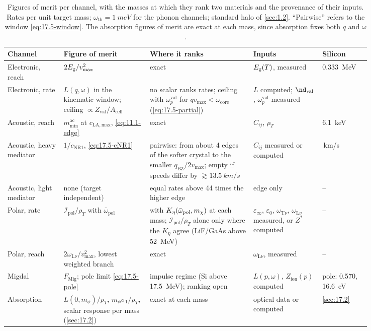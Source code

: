 \begin{table}[tbp]
\centering
\caption{Figures of merit per channel, with the masses at which they rank two materials and the provenance of their inputs. Rates per unit target mass; $\omega_{\mathrm{th}} = \SI{1}{meV}$ for the phonon channels; standard halo of \cref{sec:1.2}. ``Pairwise'' refers to the window \cref{eq:17.5-window}. The absorption figures of merit are exact at each mass, since absorption fixes both $q$ and $\omega$.}
\label{tab:17-fom}
\footnotesize
\begin{tabular}{>{\raggedright\arraybackslash}p{0.13\linewidth}>{\raggedright\arraybackslash}p{0.20\linewidth}>{\raggedright\arraybackslash}p{0.24\linewidth}>{\raggedright\arraybackslash}p{0.16\linewidth}>{\raggedright\arraybackslash}p{0.11\linewidth}}
\toprule
Channel & Figure of merit & Where it ranks & Inputs & Silicon \\
\midrule
Electronic, reach & $2E_{\mathrm{g}}/v_{\mathrm{max}}^2$ & exact & $E_{\mathrm{g}}(T)$, measured & \SI{0.333}{MeV} \\
Electronic, rate & $L(q,\omega)$ in the kinematic window; ceiling $\propto Z_{\mathrm{val}}/A_{\mathrm{cell}}$ & no scalar ranks rates; ceiling with $\omega_p^{\mathrm{val}}$ for $qv_{\mathrm{max}} < \omega_{\mathrm{core}}$ (\cref{eq:17.5-partial}) & $L$ computed; $\nd_{\mathrm{val}}$, $\omega_p^{\mathrm{val}}$ measured & 0.142 \\
Acoustic, reach & $m_{\mathrm{min}}^{\mathrm{ac}}$ at $c_{\mathrm{LA,max}}$, \cref{eq:11.1-edge} & exact & $C_{ij}$, $\rho_T$ & \SI{6.1}{keV} \\
Acoustic, heavy mediator & $1/c_{\mathrm{NR1}}$, \cref{eq:17.5-cNR1} & pairwise: from about 4 edges of the softer crystal to the smaller $q_{\mathrm{BZ}}/2v_{\mathrm{max}}$; empty if speeds differ by $\gtrsim\SI{13.5}{km/s}$ & $C_{ij}$ measured or computed & 8.956\,km/s \\
Acoustic, light mediator & none (target independent) & equal rates above 44 times the higher edge & edge only & -- \\
Polar, rate & $\mathcal{I}_{\mathrm{pol}}/\rho_T$ with $\bar\omega_{\mathrm{pol}}$ & with $K_\eta(\bar\omega_{\mathrm{pol}},m_{\chi})$ at each mass; $\mathcal{I}_{\mathrm{pol}}/\rho_T$ alone only where the $K_\eta$ agree (LiF/GaAs above \SI{52}{MeV}) & $\varepsilon_\infty$, $\varepsilon_0$, $\omega_{\mathrm{T}\nu}$, $\omega_{\mathrm{L}\nu}$ measured, or $Z^*$ computed & -- \\
Polar, reach & $2\omega_{\mathrm{L}\nu}/v_{\mathrm{max}}^2$, lowest weighted branch & exact & $\omega_{\mathrm{L}\nu}$, measured & -- \\
Migdal & $F_{\mathrm{Mig}}$; pole limit \cref{eq:17.5-pole} & impulse regime (Si above \SI{17.5}{MeV}); ranking open & $L(p,\omega)$, $Z_{\mathrm{ion}}(p)$ computed & pole: 0.570, \SI{16.6}{eV} \\
Absorption & $L(0,m_\phi)/\rho_T$, $m_\phi\sigma_1/\rho_T$, scalar response per mass (\cref{sec:17.2}) & exact at each mass & optical data or computed & \cref{sec:17.2} \\
\bottomrule
\end{tabular}
\end{table}

